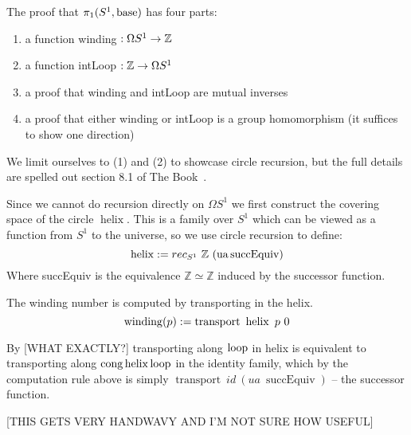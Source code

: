 The proof that $\pi_1(S^1, \operatorname{base})$ has four parts:
\begin{enumerate}
  \item a function winding $: \Omega S^1 \rightarrow \mathbb{Z}$
  \item a function intLoop $: \mathbb{Z} \rightarrow \Omega S^1$
  \item a proof that winding and intLoop are mutual inverses
  \item a proof that either winding or intLoop is a group homomorphism (it
    suffices to show one direction)
\end{enumerate}
We limit ourselves to (1) and (2) to showcase circle recursion, but the full
details are spelled out section 8.1 of The Book~\cite{hottbook}.

Since we cannot do recursion directly on $\Omega S^1$ we first construct the
covering space of the circle $\operatorname{helix}$. This is a family over $S^1$
which can be viewed as a function from $S^1$ to the universe, so we use circle
recursion to define:
\[
  \operatorname{helix} := rec_{S^1} ~ \mathbb{Z} ~ (\operatorname{ua} \operatorname{succEquiv})
\]
Where succEquiv is the equivalence $\mathbb{Z} \simeq \mathbb{Z}$ induced by the
successor function.

The winding number is computed by transporting in the helix.
\[
  \operatorname{winding}(p) := \operatorname{transport}~\operatorname{helix}~p~0
\]

By [WHAT EXACTLY?] transporting along $\operatorname{loop}$ in helix is equivalent to
transporting along $\operatorname{cong} \operatorname{helix} \operatorname{loop}$ in the identity family, which by the
computation rule above is simply
$\operatorname{transport}~id~(ua~\operatorname{succEquiv})$ -- the successor function.

[THIS GETS VERY HANDWAVY AND I'M NOT SURE HOW USEFUL]